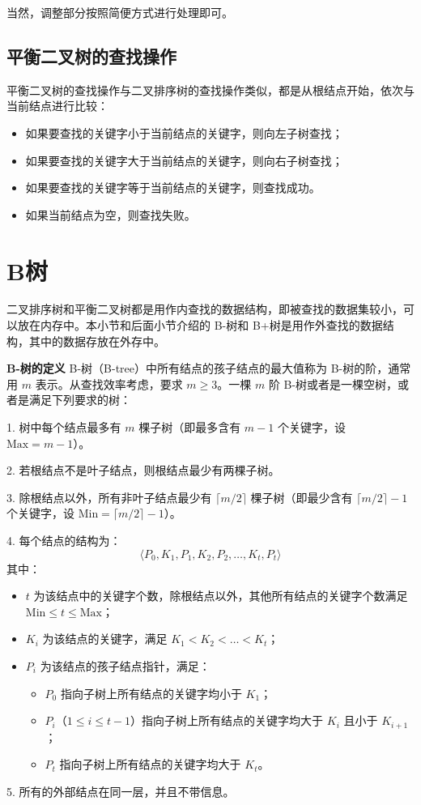 \documentclass[lang=cn,newtx,10pt,scheme=chinese]{../elegantbook}
\begin{document}
   当然，调整部分按照简便方式进行处理即可。

   \subsection{平衡二叉树的查找操作}

平衡二叉树的查找操作与二叉排序树的查找操作类似，都是从根结点开始，依次与当前结点进行比较：
\begin{itemize}
  \item 如果要查找的关键字小于当前结点的关键字，则向左子树查找；
  \item 如果要查找的关键字大于当前结点的关键字，则向右子树查找；
  \item 如果要查找的关键字等于当前结点的关键字，则查找成功。
  \item 如果当前结点为空，则查找失败。
  \end{itemize}




\section{B树}


二叉排序树和平衡二叉树都是用作内查找的数据结构，即被查找的数据集较小，可以放在内存中。本小节和后面小节介绍的 B-树和 B+树是用作外查找的数据结构，其中的数据存放在外存中。


\textbf{B-树的定义}  
B-树（B-tree）中所有结点的孩子结点的最大值称为 B-树的阶，通常用 $m$ 表示。从查找效率考虑，要求 $m \geq 3$。一棵 $m$ 阶 B-树或者是一棵空树，或者是满足下列要求的树：

1. 树中每个结点最多有 $m$ 棵子树（即最多含有 $m-1$ 个关键字，设 $\text{Max} = m-1$）。

2. 若根结点不是叶子结点，则根结点最少有两棵子树。

3. 除根结点以外，所有非叶子结点最少有 $\lceil m/2 \rceil$ 棵子树（即最少含有 $\lceil m/2 \rceil - 1$ 个关键字，设 $\text{Min} = \lceil m/2 \rceil - 1$）。

4. 每个结点的结构为：
   \[
   \langle P_0, K_1, P_1, K_2, P_2, \dots, K_t, P_t \rangle
   \]
   其中：
   \begin{itemize}
     \item $t$ 为该结点中的关键字个数，除根结点以外，其他所有结点的关键字个数满足 $\text{Min} \leq t \leq \text{Max}$；
     \item $K_i$ 为该结点的关键字，满足 $K_1 < K_2 < \dots < K_t$；
     \item $P_i$ 为该结点的孩子结点指针，满足：
       \begin{itemize}
         \item $P_0$ 指向子树上所有结点的关键字均小于 $K_1$；
         \item $P_i$（$1 \leq i \leq t-1$）指向子树上所有结点的关键字均大于 $K_i$ 且小于 $K_{i+1}$；
         \item $P_t$ 指向子树上所有结点的关键字均大于 $K_t$。
       \end{itemize}
   \end{itemize}
5. 所有的外部结点在同一层，并且不带信息。
\end{document}
